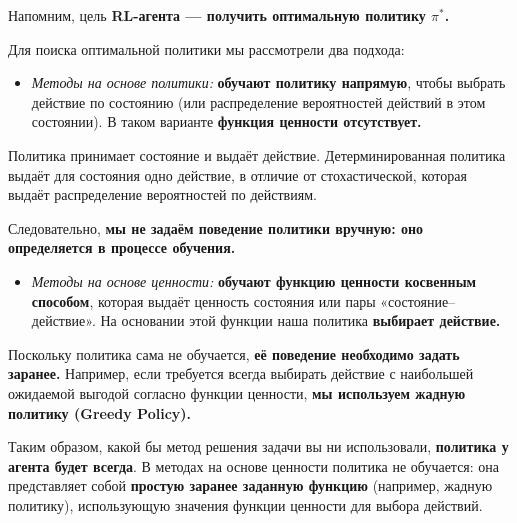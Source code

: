 \documentclass[11pt,a4paper]{article}
\begin{document}
Напомним, цель \textbf{RL-агента --- получить оптимальную политику \(\pi^*\).}

Для поиска оптимальной политики мы рассмотрели два подхода:

\begin{itemize}
\tightlist
\item
  \emph{Методы на основе политики:} \textbf{обучают политику напрямую}, чтобы выбрать действие по состоянию (или распределение вероятностей действий в этом состоянии). В таком варианте \textbf{функция ценности отсутствует.}
\end{itemize}


Политика принимает состояние и выдаёт действие. Детерминированная политика выдаёт для состояния одно действие, в отличие от стохастической, которая выдаёт распределение вероятностей по действиям.

Следовательно, \textbf{мы не задаём поведение политики вручную: оно определяется в процессе обучения.}

\begin{itemize}
\tightlist
\item
  \emph{Методы на основе ценности:} \textbf{обучают функцию ценности косвенным способом}, которая выдаёт ценность состояния или пары «состояние--действие». На основании этой функции наша политика \textbf{выбирает действие.}
\end{itemize}

Поскольку политика сама не обучается, \textbf{её поведение необходимо задать заранее.} Например, если требуется всегда выбирать действие с наибольшей ожидаемой выгодой согласно функции ценности, \textbf{мы используем жадную политику (Greedy Policy).}


Таким образом, какой бы метод решения задачи вы ни использовали, \textbf{политика у агента будет всегда}. В методах на основе ценности политика не обучается: она представляет собой \textbf{простую заранее заданную функцию} (например, жадную политику), использующую значения функции ценности для выбора действий.
\end{document}
